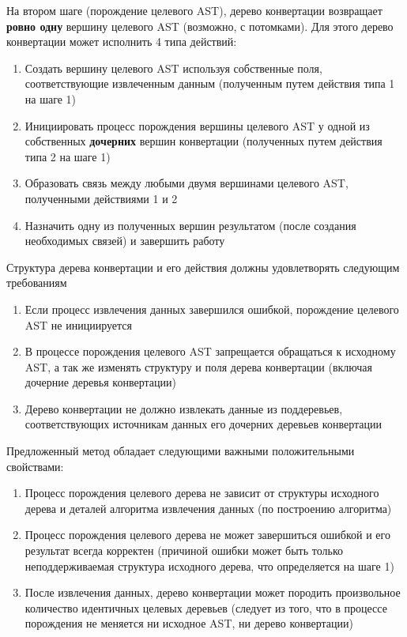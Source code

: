 На втором шаге (порождение целевого AST), дерево конвертации возвращает \textbf{ровно одну} вершину целевого AST (возможно, с потомками). Для этого дерево конвертации может исполнить 4 типа действий:

\begin{enumerate}
    \item Создать вершину целевого AST используя собственные поля, соответствующие извлеченным данным (полученным путем действия типа 1 на шаге 1)
    \item Инициировать процесс порождения вершины целевого AST у одной из собственных \textbf{дочерних} вершин конвертации (полученных путем действия типа 2 на шаге 1)
    \item Образовать связь между любыми двумя вершинами целевого AST, полученными действиями 1 и 2
    \item Назначить одну из полученных вершин результатом (после создания необходимых связей) и завершить работу
\end{enumerate}

Структура дерева конвертации и его действия должны удовлетворять следующим требованиям
\begin{enumerate}
    \item Если процесс извлечения данных завершился ошибкой, порождение целевого AST не инициируется
    \item В процессе порождения целевого AST запрещается обращаться к исходному AST, а так же изменять структуру и поля дерева конвертации (включая дочерние деревья конвертации)
    \item Дерево конвертации не должно извлекать данные из поддеревьев, соответствующих источникам данных его дочерних деревьев конвертации
\end{enumerate}

Предложенный метод обладает следующими важными положительными свойствами:
\begin{enumerate}
    \item Процесс порождения целевого дерева не зависит от структуры исходного дерева и деталей алгоритма извлечения данных (по построению алгоритма)
    \item Процесс порождения целевого дерева не может завершиться ошибкой и его результат всегда корректен (причиной ошибки может быть только неподдерживаемая структура исходного дерева, что определяется на шаге 1)
    \item После извлечения данных, дерево конвертации может породить произвольное количество идентичных целевых деревьев (следует из того, что в процессе порождения не меняется ни исходное AST, ни дерево конвертации)
\end{enumerate}

